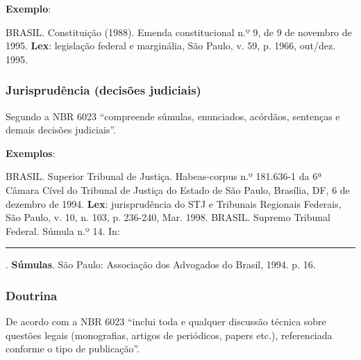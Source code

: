 \begin{exemplomanual}
\textbf{Exemplo}:\\
\begin{singlespace}
BRASIL. Constituição (1988). Emenda constitucional n.º 9, de 9 de
novembro de 1995. \textbf{Lex}: legislação federal e marginália, São Paulo, v.
59, p. 1966, out/dez. 1995.
\end{singlespace}
\end{exemplomanual}


\subsubsection{Jurisprudência (decisões judiciais)}

Segundo a NBR 6023 \cite[p.9]{NBR6023:2002} ``compreende súmulas, enunciados, acórdãos, sentenças e demais decisões judiciais''.

\begin{flushleft}
\begin{singlespace}
\end{singlespace}
\end{flushleft}

\begin{exemplomanual}
\textbf{Exemplos}:\\
\begin{singlespace}
BRASIL. Superior Tribunal de Justiça. Habeas-corpus n.º 181.636-1 da 6ª Câmara Cível do Tribunal de Justiça do Estado de São Paulo, Brasília, DF, 6 de dezembro de 1994. \textbf{Lex}: jurisprudência do STJ e Tribunais Regionais Federais, São Paulo, v. 10, n. 103, p. 236-240, Mar. 1998.
\newline
\newline
BRASIL. Supremo Tribunal Federal. Súmula n.º 14. In: \rule{1cm}{0.4pt}. \textbf{Súmulas}. São Paulo: Associação dos Advogados do Brasil, 1994. p. 16.
\end{singlespace}
\end{exemplomanual}


\subsubsection{Doutrina}

De acordo com a NBR 6023 \cite[p.10]{NBR6023:2002} ``inclui toda e qualquer discussão técnica sobre questões legais (monografias, artigos de periódicos, papers etc.), referenciada conforme o tipo de publicação''. 

